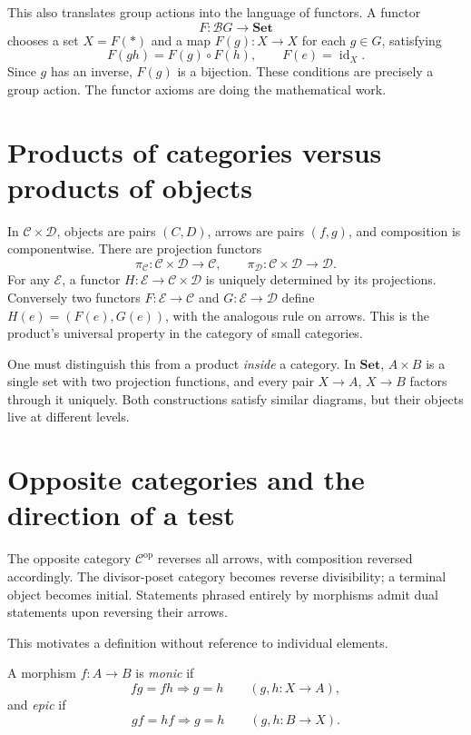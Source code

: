 This also translates group actions into the language of functors. A functor
\[
 F:\mathcal BG\longrightarrow\mathbf{Set}
\]
chooses a set \(X=F(*)\) and a map \(F(g):X\to X\) for each \(g\in G\), satisfying
\[
 F(gh)=F(g)\circ F(h),\qquad F(e)=\operatorname{id}_X.
\]
Since \(g\) has an inverse, \(F(g)\) is a bijection. These conditions are precisely a group action. The functor axioms are doing the mathematical work.

\section{Products of categories versus products of objects}

In \(\mathcal C\times\mathcal D\), objects are pairs \((C,D)\), arrows are pairs \((f,g)\), and composition is componentwise. There are projection functors
\[
 \pi_{\mathcal C}:\mathcal C\times\mathcal D\to\mathcal C,\qquad
 \pi_{\mathcal D}:\mathcal C\times\mathcal D\to\mathcal D.
\]
For any \(\mathcal E\), a functor \(H:\mathcal E\to\mathcal C\times\mathcal D\) is uniquely determined by its projections. Conversely two functors \(F:\mathcal E\to\mathcal C\) and \(G:\mathcal E\to\mathcal D\) define \(H(e)=(F(e),G(e))\), with the analogous rule on arrows. This is the product's universal property in the category of small categories.

One must distinguish this from a product \emph{inside} a category. In \(\mathbf{Set}\), \(A\times B\) is a single set with two projection functions, and every pair \(X\to A\), \(X\to B\) factors through it uniquely. Both constructions satisfy similar diagrams, but their objects live at different levels.

\section{Opposite categories and the direction of a test}

The opposite category \(\mathcal C^{\mathrm{op}}\) reverses all arrows, with composition reversed accordingly. The divisor-poset category becomes reverse divisibility; a terminal object becomes initial. Statements phrased entirely by morphisms admit dual statements upon reversing their arrows.

This motivates a definition without reference to individual elements.

\begin{definition}
A morphism \(f:A\to B\) is \emph{monic} if
\[
 fg=fh\Longrightarrow g=h\qquad(g,h:X\to A),
\]
and \emph{epic} if
\[
 gf=hf\Longrightarrow g=h\qquad(g,h:B\to X).
\]
\end{definition}

